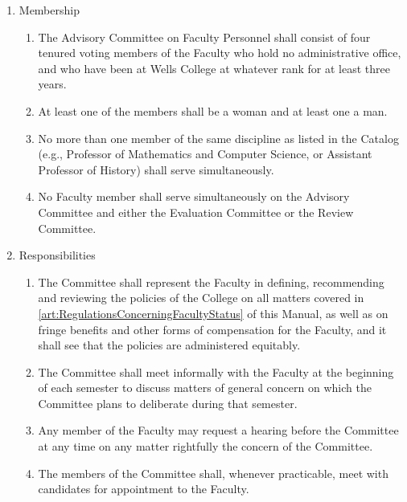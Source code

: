 \documentclass{manual}
\newcommand{\itemLevelA}{\alph*.}
\newcommand{\itemLevelB}{\arabic*)}
\newcommand{\itemRefA}{\alph*}
\newcommand{\itemRefB}{\arabic*}
\begin{document}
\begin{enumerate}[label=\itemLevelA,ref=\itemRefA]

\item Membership \label{item:membership06}
\begin{enumerate}[label=\itemLevelB,ref=\itemRefB]

\item The Advisory Committee on Faculty Personnel shall consist of four tenured voting members of the Faculty who hold no administrative office, and who have been at Wells College at whatever rank for at least three years.

\item At least one of the members shall be a woman and at least one a man.

\item\label{iitem:crossdiscipline07} No more than one member of the same discipline as listed in the Catalog (e.g., Professor of Mathematics and Computer Science, or Assistant Professor of History) shall serve simultaneously.

\item No Faculty member shall serve simultaneously on the Advisory Committee and either the Evaluation Committee or the Review Committee.
\end{enumerate}

\item Responsibilities
\begin{enumerate}[label=\itemLevelB,ref=\itemRefB]

\item The Committee shall represent the Faculty in defining, recommending and reviewing the policies of the College on all matters covered in \cref{art:RegulationsConcerningFacultyStatus} of this Manual, as well as on fringe benefits and other forms of compensation for the Faculty, and it shall see that the policies are administered equitably.

\item The Committee shall meet informally with the Faculty at the beginning of each semester to discuss matters of general concern on which the Committee plans to deliberate during that semester.

\item Any member of the Faculty may request a hearing before the Committee at any time on any matter rightfully the concern of the Committee.

\item The members of the Committee shall, whenever practicable, meet with candidates for appointment to the Faculty.



\end{enumerate}
\end{enumerate}
\end{document}
